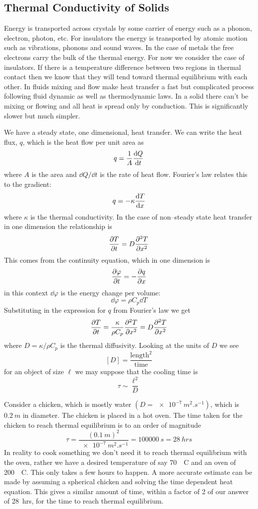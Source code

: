     \subsection{Thermal Conductivity of Solids}
    Energy is transported across crystals by some carrier of energy such as a phonon, electron, photon, etc.
    For insulators the energy is transported by atomic motion such as vibrations, phonons and sound waves.
    In the case of metals the free electrons carry the bulk of the thermal energy.
    For now we consider the case of insulators.
    If there is a temperature difference between two regions in thermal contact then we know that they will tend toward thermal equilibrium with each other.
    In fluids mixing and flow make heat transfer a fast but complicated process following fluid dynamic as well as thermodynamic laws.
    In a solid there can't be mixing or flowing and all heat is spread only by conduction.
    This is significantly slower but much simpler.
    
    We have a steady state, one dimensional, heat transfer.
    We can write the heat flux, \(q\), which is the heat flow per unit area as
    \[q = \frac{1}{A}\dv{Q}{t}\]
    where \(A\) is the area and \(\dd Q/\dd t\) is the rate of heat flow.
    Fourier's law relates this to the gradient:
    \[q = -\kappa\dv{T}{x}\]
    where \(\kappa\) is the thermal conductivity.
    In the case of non--steady state heat transfer in one dimension the relationship is
    \[\pdv{T}{t} = D\pdv[2]{T}{x}\]
    This comes from the continuity equation, which in one dimension is
    \[\pdv{\varphi}{t} = -\pdv{q}{x}\]
    in this context \(\dd \varphi\) is the energy change per volume:
    \[\dd\varphi = \rho C_p\dd T\]
    Substituting in the expression for \(q\) from Fourier's law we get
    \[\pdv{T}{t} = \frac{\kappa}{\rho C_p}\pdv[2]{T}{x} = D\pdv[2]{T}{x}\]
    where \(D = \kappa/\rho C_p\) is the thermal diffusivity.
    Looking at the units of \(D\) we see
    \[[D] = \frac{\text{length}^2}{\text{time}}\]
    for an object of size \(\ell\) we may suppose that the cooling time is
    \[\tau \sim \frac{\ell^2}{D}\]
    
    \example
    Consider a chicken, which is mostly water \((D = \SI{e-7}{m^2.s^{-1}})\), which is \(\SI{0.2}{m}\) in diameter.
    The chicken is placed in a hot oven.
    The time taken for the chicken to reach thermal equilibrium is to an order of magnitude
    \[\tau = \frac{(\SI{0.1}{m})^2}{\SI{e-7}{m^2.s^{-1}}} = \SI{100000}{s} = \SI{28}{hrs}\]
    In reality to cook something we don't need it to reach thermal equilibrium with the oven, rather we have a desired temperature of say \SI{70}{\SIUnitSymbolDegree C} and an oven of \SI{200}{\SIUnitSymbolDegree C}.
    This only takes a few hours to happen.
    A more accurate estimate can be made by assuming a spherical chicken and solving the time dependent heat equation.
    This gives a similar amount of time, within a factor of 2 of our answer of \SI{28}{hrs}, for the time to reach thermal equilibrium.
    
